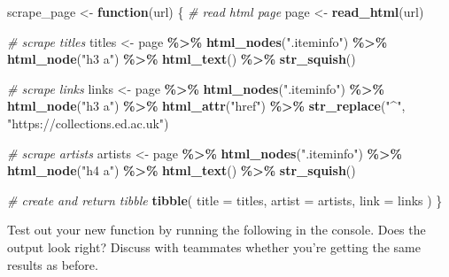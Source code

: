 \documentclass[
]{article}
\newenvironment{Shaded}{\begin{snugshade}}{\end{snugshade}}
\newcommand{\AttributeTok}[1]{\textcolor[rgb]{0.13,0.29,0.53}{#1}}
\newcommand{\CommentTok}[1]{\textcolor[rgb]{0.56,0.35,0.01}{\textit{#1}}}
\newcommand{\ControlFlowTok}[1]{\textcolor[rgb]{0.13,0.29,0.53}{\textbf{#1}}}
\newcommand{\FunctionTok}[1]{\textcolor[rgb]{0.13,0.29,0.53}{\textbf{#1}}}
\newcommand{\NormalTok}[1]{#1}
\newcommand{\OtherTok}[1]{\textcolor[rgb]{0.56,0.35,0.01}{#1}}
\newcommand{\SpecialCharTok}[1]{\textcolor[rgb]{0.81,0.36,0.00}{\textbf{#1}}}
\newcommand{\StringTok}[1]{\textcolor[rgb]{0.31,0.60,0.02}{#1}}
\begin{document}
\begin{Shaded}
\begin{Highlighting}[]
\NormalTok{scrape\_page }\OtherTok{\textless{}{-}} \ControlFlowTok{function}\NormalTok{(url) \{}
  \CommentTok{\# read html page}
\NormalTok{  page }\OtherTok{\textless{}{-}} \FunctionTok{read\_html}\NormalTok{(url)}

  \CommentTok{\# scrape titles}
\NormalTok{  titles }\OtherTok{\textless{}{-}}\NormalTok{ page }\SpecialCharTok{\%\textgreater{}\%}
    \FunctionTok{html\_nodes}\NormalTok{(}\StringTok{".iteminfo"}\NormalTok{) }\SpecialCharTok{\%\textgreater{}\%}
    \FunctionTok{html\_node}\NormalTok{(}\StringTok{"h3 a"}\NormalTok{) }\SpecialCharTok{\%\textgreater{}\%}
    \FunctionTok{html\_text}\NormalTok{() }\SpecialCharTok{\%\textgreater{}\%}
    \FunctionTok{str\_squish}\NormalTok{()}

  \CommentTok{\# scrape links}
\NormalTok{  links }\OtherTok{\textless{}{-}}\NormalTok{ page }\SpecialCharTok{\%\textgreater{}\%}
    \FunctionTok{html\_nodes}\NormalTok{(}\StringTok{".iteminfo"}\NormalTok{) }\SpecialCharTok{\%\textgreater{}\%}
    \FunctionTok{html\_node}\NormalTok{(}\StringTok{"h3 a"}\NormalTok{) }\SpecialCharTok{\%\textgreater{}\%}
    \FunctionTok{html\_attr}\NormalTok{(}\StringTok{"href"}\NormalTok{) }\SpecialCharTok{\%\textgreater{}\%}
    \FunctionTok{str\_replace}\NormalTok{(}\StringTok{"\^{}"}\NormalTok{, }\StringTok{"https://collections.ed.ac.uk"}\NormalTok{)}

  \CommentTok{\# scrape artists}
\NormalTok{  artists }\OtherTok{\textless{}{-}}\NormalTok{ page }\SpecialCharTok{\%\textgreater{}\%}
    \FunctionTok{html\_nodes}\NormalTok{(}\StringTok{".iteminfo"}\NormalTok{) }\SpecialCharTok{\%\textgreater{}\%}
    \FunctionTok{html\_node}\NormalTok{(}\StringTok{"h4 a"}\NormalTok{) }\SpecialCharTok{\%\textgreater{}\%}
    \FunctionTok{html\_text}\NormalTok{() }\SpecialCharTok{\%\textgreater{}\%}
    \FunctionTok{str\_squish}\NormalTok{()}

  \CommentTok{\# create and return tibble}
  \FunctionTok{tibble}\NormalTok{(}
    \AttributeTok{title =}\NormalTok{ titles,}
    \AttributeTok{artist =}\NormalTok{ artists,}
    \AttributeTok{link =}\NormalTok{ links}
\NormalTok{  )}
\NormalTok{\}}
\end{Highlighting}
\end{Shaded}

Test out your new function by running the following in the console. Does
the output look right? Discuss with teammates whether you're getting the
same results as before.
\end{document}
